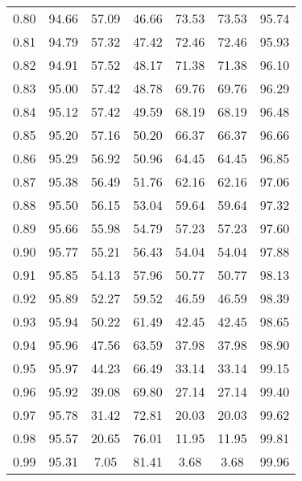\begin{tabular}{|c|c|c|c|c|c|c|}
      0.80 &     94.66 &     57.09 &      46.66 &   73.53 &      73.53 &         95.74 \\
      0.81 &     94.79 &     57.32 &      47.42 &   72.46 &      72.46 &         95.93 \\
      0.82 &     94.91 &     57.52 &      48.17 &   71.38 &      71.38 &         96.10 \\
      0.83 &     95.00 &     57.42 &      48.78 &   69.76 &      69.76 &         96.29 \\
      0.84 &     95.12 &     57.42 &      49.59 &   68.19 &      68.19 &         96.48 \\
      0.85 &     95.20 &     57.16 &      50.20 &   66.37 &      66.37 &         96.66 \\
      0.86 &     95.29 &     56.92 &      50.96 &   64.45 &      64.45 &         96.85 \\
      0.87 &     95.38 &     56.49 &      51.76 &   62.16 &      62.16 &         97.06 \\
      0.88 &     95.50 &     56.15 &      53.04 &   59.64 &      59.64 &         97.32 \\
      0.89 &     95.66 &     55.98 &      54.79 &   57.23 &      57.23 &         97.60 \\
      0.90 &     95.77 &     55.21 &      56.43 &   54.04 &      54.04 &         97.88 \\
      0.91 &     95.85 &     54.13 &      57.96 &   50.77 &      50.77 &         98.13 \\
      0.92 &     95.89 &     52.27 &      59.52 &   46.59 &      46.59 &         98.39 \\
      0.93 &     95.94 &     50.22 &      61.49 &   42.45 &      42.45 &         98.65 \\
      0.94 &     95.96 &     47.56 &      63.59 &   37.98 &      37.98 &         98.90 \\
      0.95 &     95.97 &     44.23 &      66.49 &   33.14 &      33.14 &         99.15 \\
      0.96 &     95.92 &     39.08 &      69.80 &   27.14 &      27.14 &         99.40 \\
      0.97 &     95.78 &     31.42 &      72.81 &   20.03 &      20.03 &         99.62 \\
      0.98 &     95.57 &     20.65 &      76.01 &   11.95 &      11.95 &         99.81 \\
      0.99 &     95.31 &      7.05 &      81.41 &    3.68 &       3.68 &         99.96 \\
\bottomrule
\end{tabular}
